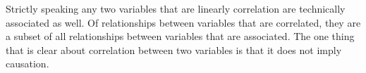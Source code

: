 \documentclass[12pt]{article}
\begin{document}
\begin{enumerate}
\begin{tcolorbox}[colback=white, sharp corners]
\end{tcolorbox}


\begin{tcolorbox}[colback=white, sharp corners]

Strictly speaking any two variables that are linearly correlation are technically associated as well. Of relationships between variables that are correlated, they are a subset of all relationships between variables that are associated. The one thing that is clear about correlation between two variables is that it does not imply causation.

\end{tcolorbox}

\end{enumerate}

\newpage
\end{document}
